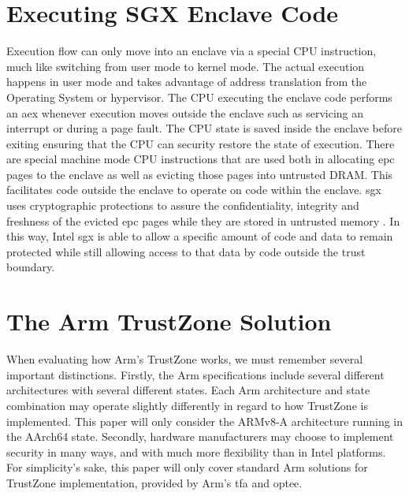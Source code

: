 \section{Executing SGX Enclave Code}
Execution flow can only move into an enclave via a special CPU instruction, much like switching from user mode to kernel mode. The actual execution happens in user mode and takes advantage of address translation from the Operating System or hypervisor. The CPU executing the enclave code performs an \gls{aex} whenever execution moves outside the enclave such as servicing an interrupt or during a page fault. The CPU state is saved inside the enclave before exiting ensuring that the CPU can security restore the state of execution. There are special machine mode CPU instructions that are used both in allocating \gls{epc} pages to the enclave as well as evicting those pages into untrusted DRAM. This facilitates code outside the enclave to operate on code within the enclave. \gls{sgx} uses cryptographic protections to assure the confidentiality, integrity and freshness of the evicted \gls{epc} pages while they are stored in untrusted memory \cite{Costan2016IntelSE}. In this way, Intel \gls{sgx} is able to allow a specific amount of code and data to remain protected while still allowing access to that data by code outside the trust boundary.
\section{The Arm TrustZone Solution}
When evaluating how Arm’s TrustZone works, we must remember several important distinctions. Firstly, the Arm specifications include several different architectures with several different states. Each Arm architecture and state combination may operate slightly differently in regard to how TrustZone is implemented. This paper will only consider the ARMv8-A architecture running in the AArch64 state. Secondly, hardware manufacturers may choose to implement security in many ways, and with much more flexibility than in Intel platforms. For simplicity’s sake, this paper will only cover standard Arm solutions for TrustZone implementation, provided by Arm's \gls{tfa} and \gls{optee}.
 
